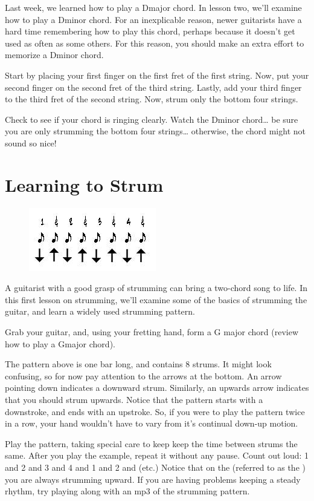 Last week, we learned how to play a Dmajor chord. In lesson two, we'll examine
how to play a Dminor chord. For an inexplicable reason, newer guitarists have a
hard time remembering how to play this chord, perhaps because it doesn't get
used as often as some others. For this reason, you should make an extra effort
to memorize a Dminor chord.

Start by placing your first finger on the first fret of the first string. Now,
put your second finger on the second fret of the third string. Lastly, add your
third finger to the third fret of the second string. Now, strum only the bottom
four strings.

Check to see if your chord is ringing clearly. Watch the Dminor chord\ldots{} be
sure you are only strumming the bottom four strings\ldots{} otherwise, the chord
might not sound so nice!

\section{Learning to Strum}
\begin{figure}
\includegraphics{parttwo/strum1.jpg}
\end{figure}

A guitarist with a good grasp of strumming can bring a two-chord song to life.
In this first lesson on strumming, we'll examine some of the basics of
strumming the guitar, and learn a widely used strumming pattern.

Grab your guitar, and, using your fretting hand, form a G major chord (review
how to play a Gmajor chord).

The pattern above is one bar long, and contains 8 strums. It might look
confusing, so for now pay attention to the arrows at the bottom. An arrow
pointing down indicates a downward strum. Similarly, an upwards arrow indicates
that you should strum upwards. Notice that the pattern starts with a
downstroke, and ends with an upstroke. So, if you were to play the pattern
twice in a row, your hand wouldn't have to vary from it's continual down-up
motion.

Play the pattern, taking special care to keep keep the time between strums the
same. After you play the example, repeat it without any pause. Count out loud:
1 and 2 and 3 and 4 and 1 and 2 and (etc.) Notice that on the  (referred
to as the ) you are always strumming upward. If you are having
problems keeping a steady rhythm, try playing along with an mp3 of the
strumming pattern.

